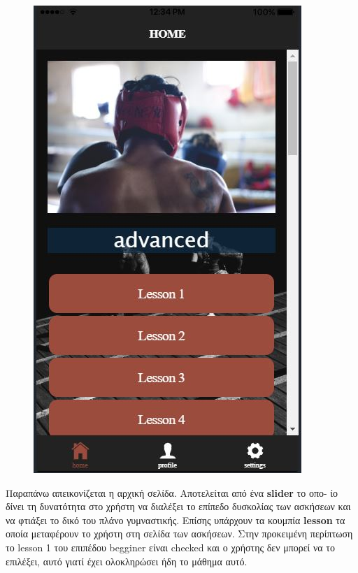 \documentclass[a4paper,12pt]{article}
\begin{document}
\begin{figure}[!htb]
				\endminipage\hfill
				  \includegraphics[width=\linewidth]{home3}
				  
				\endminipage
			\end{figure}

			\vspace*{1cm}


			Παραπάνω απεικονίζεται η αρχική σελίδα. Αποτελείται από ένα \textbf{slider} το οπο-
			ίο δίνει τη δυνατότητα στο χρήστη να διαλέξει 
			το επίπεδο δυσκολίας των ασκήσεων και να φτιάξει το δικό του πλάνο γυμναστικής. Επίσης υπάρχουν τα κουμπία \textbf{lesson} τα οποία μεταφέρουν το χρήστη στη σελίδα των ασκήσεων. Στην 
			προκειμένη περίπτωση το lesson 1 του επιπέδου begginer είναι checked και ο χρήστης δεν μπορεί να το επιλέξει, αυτό γιατί έχει 
			ολοκληρώσει ήδη το μάθημα αυτό. 
\end{document}
